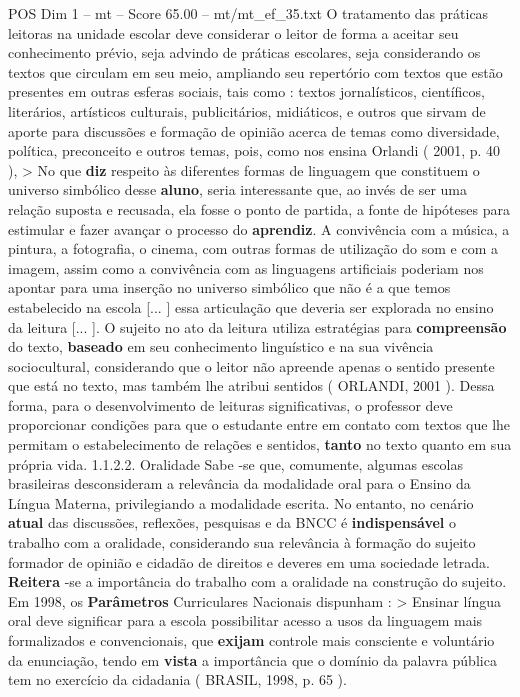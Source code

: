 \begin{textsample}{POS Dim 1 – mt – Score 65.00 – mt/mt\_ef\_35.txt}
O tratamento das práticas leitoras na unidade escolar deve considerar o leitor de forma a aceitar seu conhecimento prévio, seja advindo de práticas escolares, seja considerando os textos que circulam em seu meio, ampliando seu repertório com textos que estão presentes em outras esferas sociais, tais como : textos jornalísticos, científicos, literários, artísticos culturais, publicitários, midiáticos, e outros que sirvam de aporte para discussões e formação de opinião acerca de temas como diversidade, política, preconceito e outros temas, pois, como nos ensina Orlandi ( 2001, p. 40 ), > No que \textbf{diz} respeito às diferentes formas de linguagem que constituem o universo simbólico desse \textbf{aluno}, seria interessante que, ao invés de ser uma relação suposta e recusada, ela fosse o ponto de partida, a fonte de hipóteses para estimular e fazer avançar o processo do \textbf{aprendiz}.
A convivência com a música, a pintura, a fotografia, o cinema, com outras formas de utilização do som e com a imagem, assim como a convivência com as linguagens artificiais poderiam nos apontar para uma inserção no universo simbólico que não é a que temos estabelecido na escola [... ] essa articulação que deveria ser explorada no ensino da leitura [... ].
O sujeito no ato da leitura utiliza estratégias para \textbf{compreensão} do texto, \textbf{baseado} em seu conhecimento linguístico e na sua vivência sociocultural, considerando que o leitor não apreende apenas o sentido presente que está no texto, mas também lhe atribui sentidos ( ORLANDI, 2001 ).
Dessa forma, para o desenvolvimento de leituras significativas, o professor deve proporcionar condições para que o estudante entre em contato com textos que lhe permitam o estabelecimento de relações e sentidos, \textbf{tanto} no texto quanto em sua própria vida. 1.1.2.2.
Oralidade Sabe -se que, comumente, algumas escolas brasileiras desconsideram a relevância da modalidade oral para o Ensino da Língua Materna, privilegiando a modalidade escrita.
No entanto, no cenário \textbf{atual} das discussões, reflexões, pesquisas e da BNCC é \textbf{indispensável} o trabalho com a oralidade, considerando sua relevância à formação do sujeito formador de opinião e cidadão de direitos e deveres em uma sociedade letrada. \textbf{Reitera} -se a importância do trabalho com a oralidade na construção do sujeito.
Em 1998, os \textbf{Parâmetros} Curriculares Nacionais dispunham : > Ensinar língua oral deve significar para a escola possibilitar acesso a usos da linguagem mais formalizados e convencionais, que \textbf{exijam} controle mais consciente e voluntário da enunciação, tendo em \textbf{vista} a importância que o domínio da palavra pública tem no exercício da cidadania ( BRASIL, 1998, p. 65 ).

\end{textsample}
